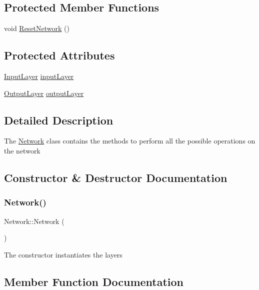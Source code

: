 \subsection*{Protected Member Functions}
\begin{DoxyCompactItemize}
\item 
void \mbox{\hyperlink{class_network_a15cc78648716e93c1c0df54f75d70a98}{Reset\+Network}} ()
\end{DoxyCompactItemize}
\subsection*{Protected Attributes}
\begin{DoxyCompactItemize}
\item 
\mbox{\hyperlink{class_input_layer}{Input\+Layer}} \mbox{\hyperlink{class_network_a09e2b3de83ec93b35349e4c72fabed65}{input\+Layer}}
\item 
\mbox{\hyperlink{class_output_layer}{Output\+Layer}} \mbox{\hyperlink{class_network_adc5fb83d4660e4ab6b15e93ae1c4ef44}{output\+Layer}}
\end{DoxyCompactItemize}


\subsection{Detailed Description}
The \mbox{\hyperlink{class_network}{Network}} class contains the methods to perform all the possible operations on the network 

\subsection{Constructor \& Destructor Documentation}
\mbox{\label{class_network_a3cc2fb4f8fa4d507077e8da85ce5a1c8}} 
\subsubsection{\texorpdfstring{Network()}{Network()}}
{\footnotesize\ttfamily Network\+::\+Network (\begin{DoxyParamCaption}{ }\end{DoxyParamCaption})}

The constructor instantiates the layers 

\subsection{Member Function Documentation}
\mbox{\label{class_network_a66fd295c613b070635e4007a097184f6}} 
